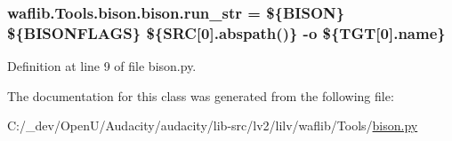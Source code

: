 \subsubsection[{\texorpdfstring{run\+\_\+str}{run_str}}]{ waflib.\+Tools.\+bison.\+bison.\+run\+\_\+str = \textquotesingle{}\$\{B\+I\+S\+ON\} \$\{B\+I\+S\+O\+N\+F\+L\+A\+GS\} \$\{S\+RC\mbox{[}0\mbox{]}.abspath()\} -\/o \$\{T\+GT\mbox{[}0\mbox{]}.{\bf name}\}\textquotesingle{}\hspace{0.3cm}{\ttfamily [static]}}\hypertarget{classwaflib_1_1_tools_1_1bison_1_1bison_aa90407d611bbca7eac76f3cef1b67b42}{}\label{classwaflib_1_1_tools_1_1bison_1_1bison_aa90407d611bbca7eac76f3cef1b67b42}


Definition at line 9 of file bison.\+py.



The documentation for this class was generated from the following file\+:\begin{DoxyCompactItemize}
\item 
C\+:/\+\_\+dev/\+Open\+U/\+Audacity/audacity/lib-\/src/lv2/lilv/waflib/\+Tools/\hyperlink{lilv_2waflib_2_tools_2bison_8py}{bison.\+py}\end{DoxyCompactItemize}
